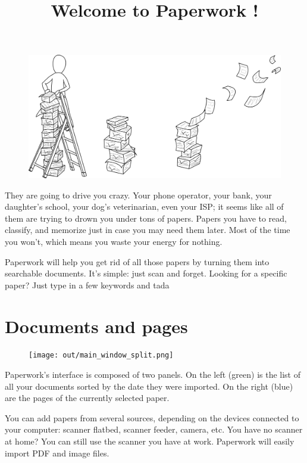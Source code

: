 \documentclass[10pt,a4paper]{article}
\date{}
\title{Welcome to Paperwork !}
\begin{document}
\maketitle

\begin{figure}[h]
	\includegraphics[width=\linewidth]{data/intro.png}
\end{figure}

They are going to drive you crazy. Your phone operator, your bank, your daughter's school, your dog's veterinarian, even your ISP; it seems like all of them are trying to drown you under tons of papers. Papers you have to read, classify, and memorize just in case you may need them later. Most of the time you won't, which means you waste your energy for nothing.

Paperwork will help you get rid of all those papers by turning them into searchable documents.
It's simple: just scan and forget. Looking for a specific paper?
Just type in a few keywords and tada

\pagebreak

\section{Documents and pages}

\begin{figure}[h]
	\texttt{[image: out/main\_window\_split.png]}
\end{figure}

Paperwork's interface is composed of two panels. On the left (green) is the
list of all your documents sorted by the date they were imported. On the right
(blue) are the pages of the currently selected paper.

You can add papers from several sources, depending on the devices connected
to your computer: scanner flatbed, scanner feeder, camera, etc. You have no
scanner at home? You can still use the scanner you have at work. Paperwork
will easily import PDF and image files.
\end{document}
